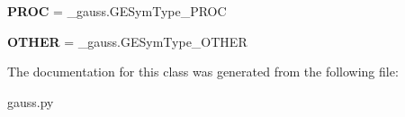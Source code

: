 \begin{DoxyCompactItemize}
\item 
\hypertarget{classgauss_1_1_g_e_sym_type_ae9500edb42eb18487ca4f8943185c0e6}{{\bfseries P\-R\-O\-C} = \-\_\-gauss.\-G\-E\-Sym\-Type\-\_\-\-P\-R\-O\-C}\label{classgauss_1_1_g_e_sym_type_ae9500edb42eb18487ca4f8943185c0e6}

\item 
\hypertarget{classgauss_1_1_g_e_sym_type_a14474a16362670bd043cb130c95d9e0d}{{\bfseries O\-T\-H\-E\-R} = \-\_\-gauss.\-G\-E\-Sym\-Type\-\_\-\-O\-T\-H\-E\-R}\label{classgauss_1_1_g_e_sym_type_a14474a16362670bd043cb130c95d9e0d}

\end{DoxyCompactItemize}


The documentation for this class was generated from the following file\-:\begin{DoxyCompactItemize}
\item 
gauss.\-py\end{DoxyCompactItemize}
